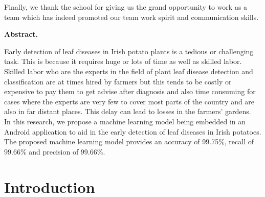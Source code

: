 \documentclass[11pt]{report}
\begin{document}
Finally, we thank the school for giving us the grand opportunity to work as a team which has indeed
promoted our team work spirit and communication skills.\\




\newpage
\tableofcontents
\thispagestyle{empty}
\cleardoublepage
\setcounter{page}{1}

\newpage

\begin{center}
	\textbf{Abstract.}\\
\end{center}
Early detection of leaf diseases in Irish potato plants is a tedious or challenging task. This is because it requires huge or lots of time as well as skilled labor.\\

Skilled labor who are the experts in the field of plant leaf disease detection and classification are at times hired by farmers but this tends to be costly or expensive to pay them to get advise after diagnosis and also time consuming for cases where the experts are
very few to cover most parts of the country and are also in far distant places. This delay can lead to losses in the farmers’ gardens.\\
 

In this research, we propose a machine learning model being embedded in an Android application to aid in the early detection of leaf diseases in Irish potatoes.\\
The proposed machine learning model provides an accuracy of 99.75\%, recall of 99.66\% and precision of 99.66\%.\\

  
\thispagestyle{empty}

\newpage
\chapter{Introduction}
\end{document}
